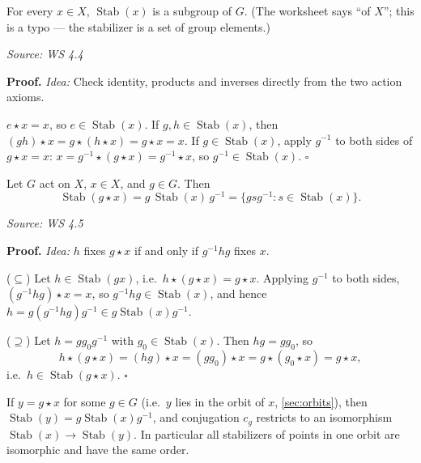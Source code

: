 \documentclass[11pt]{report}
\renewenvironment{proof}[1][Proof]{\noindent\textbf{#1.} }{\hfill$\square$\par\vspace{5pt}}
\newcommand{\srcline}[1]{\par\hfill{\footnotesize\textit{Source: #1}}}
\begin{document}
\begin{propbox}\label{prop:stabilizer-subgroup}
For every $x \in X$, $\operatorname{Stab}(x)$ is a subgroup of $G$. (The worksheet says ``of $X$''; this is a typo --- the stabilizer is a set of group elements.)
\srcline{WS 4.4}
\end{propbox}

\begin{proof}
\textit{Idea:} Check identity, products and inverses directly from the two action axioms.\par
$e \star x = x$, so $e \in \operatorname{Stab}(x)$. If $g, h \in \operatorname{Stab}(x)$, then $(gh) \star x = g \star (h \star x) = g \star x = x$. If $g \in \operatorname{Stab}(x)$, apply $g^{-1}$ to both sides of $g \star x = x$: $x = g^{-1} \star (g \star x) = g^{-1} \star x$, so $g^{-1} \in \operatorname{Stab}(x)$.
\end{proof}

\begin{propbox}\label{prop:stabilizers-points-same-orbit-conjugate}
Let $G$ act on $X$, $x \in X$, and $g \in G$. Then
\[ \operatorname{Stab}(g \star x) = g\,\operatorname{Stab}(x)\,g^{-1} = \{ g s g^{-1} : s \in \operatorname{Stab}(x) \}. \]
\srcline{WS 4.5}
\end{propbox}

\begin{proof}
\textit{Idea:} $h$ fixes $g \star x$ if and only if $g^{-1}hg$ fixes $x$.\par
($\subseteq$) Let $h \in \operatorname{Stab}(gx)$, i.e.\ $h \star (g \star x) = g \star x$. Applying $g^{-1}$ to both sides, $(g^{-1}hg) \star x = x$, so $g^{-1}hg \in \operatorname{Stab}(x)$, and hence $h = g(g^{-1}hg)g^{-1} \in g\operatorname{Stab}(x)g^{-1}$.

($\supseteq$) Let $h = g g_0 g^{-1}$ with $g_0 \in \operatorname{Stab}(x)$. Then $hg = g g_0$, so
\[ h \star (g \star x) = (hg) \star x = (g g_0) \star x = g \star (g_0 \star x) = g \star x, \]
i.e.\ $h \in \operatorname{Stab}(g \star x)$.
\end{proof}

\begin{corbox}\label{cor:stabilizers-along-orbit-conjugate}
If $y = g \star x$ for some $g \in G$ (i.e.\ $y$ lies in the orbit of $x$, \ref{sec:orbits}), then $\operatorname{Stab}(y) = g \operatorname{Stab}(x) g^{-1}$, and conjugation $c_g$ restricts to an isomorphism $\operatorname{Stab}(x) \to \operatorname{Stab}(y)$. In particular all stabilizers of points in one orbit are isomorphic and have the same order.
\end{corbox}
\end{document}
